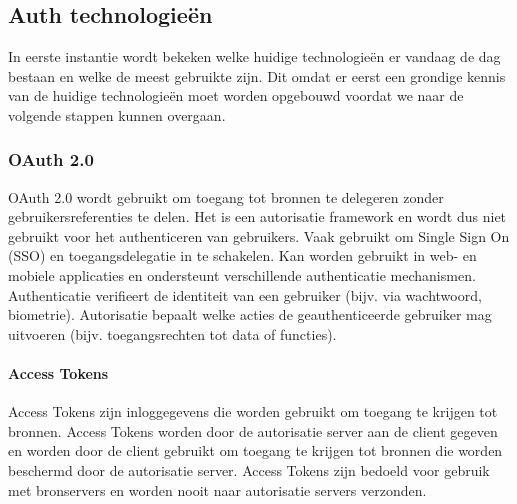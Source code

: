 \chapter{}%
\label{ch:stand-van-zaken}



\section{Auth technologieën}%
\label{sec:auth-technologieën}
In eerste instantie wordt bekeken welke huidige technologieën er vandaag de dag bestaan en welke de meest gebruikte zijn. Dit omdat er eerst een
grondige kennis van de huidige technologieën moet worden opgebouwd voordat we naar de volgende stappen kunnen overgaan.


\subsection{OAuth 2.0}%
\label{subsec:oauth-2.0}
OAuth 2.0 wordt gebruikt om toegang tot bronnen te delegeren zonder gebruikersreferenties te delen. Het is een autorisatie framework en wordt dus niet
gebruikt voor het authenticeren van gebruikers. Vaak gebruikt om Single Sign On (SSO) en toegangsdelegatie in te schakelen. Kan worden gebruikt in web-
en mobiele applicaties en ondersteunt verschillende authenticatie mechanismen. \autocite{Hardt2012}
Authenticatie verifieert de identiteit van een gebruiker (bijv. via wachtwoord, biometrie).
Autorisatie bepaalt welke acties de geauthenticeerde gebruiker mag uitvoeren (bijv. toegangsrechten tot data of functies).

\subsubsection{Access Tokens}%
\label{subsubsec:access-tokens}
Access Tokens zijn inloggegevens die worden gebruikt om toegang te krijgen tot bronnen. Access Tokens worden door de autorisatie server aan de client
gegeven en worden door de client gebruikt om toegang te krijgen tot bronnen die worden beschermd door de autorisatie server. Access Tokens zijn bedoeld
voor gebruik met bronservers en worden nooit naar autorisatie servers verzonden.

